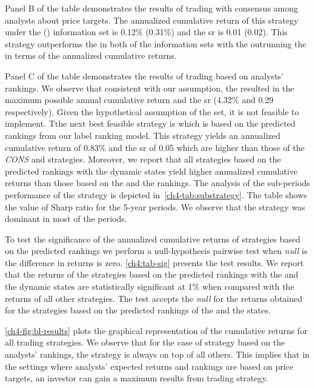 \documentclass[a4paper,twoside,12pt,openright,notitlepage]{report}\usepackage[]{graphicx}\usepackage[]{color}
\begin{document}
Panel B of the table demonstrates the results of trading with consensus among analysts about price targets. The annualized cumulative return of this strategy under the \recent{} () information set is 0.12\% (0.31\%) and the \gls{sr} is  0.01 (0.02). This strategy outperforms the \Market{} in both of the information sets with the  outrunning the \naive{} in terms of the annualized cumulative returns.

Panel C of the table demonstrates the results of trading based on analysts' rankings. We observe that consistent with our assumption, the \true{} resulted in the maximum possible annual cumulative return and the \gls{sr} (4.32\% and  0.29 respectively). Given the hypothetical assumption of the \true{} set, it is not feasible to implement. Tthe next best feasible strategy is
\diff{}
which is based on the predicted rankings from our label ranking model. This strategy yields an annualized cumulative return of 0.83\% and the \gls{sr} of 0.05 which are higher than those of the \textit{CONS} and \Market{} strategies. Moreover, we report that all strategies based on the predicted rankings with the dynamic states yield higher annualized cumulative returns than those  based on the  \naive{} and the  rankings. The analysis of the sub-periods performance of the \diff{} strategy is depicted in~\ref{ch4-tab:substrategy}. The table shows the value of Sharp ratio for the 5-year periods. We observe that the \diff{} strategy was dominant in most of the periods.

To test the significance of the annualized cumulative returns of strategies based on the predicted rankings we perform a null-hypothesis pairwise test when \emph{null} is the difference in returns is zero. \ref{ch4:tab-sig} presents the test results. We report that the returns of the strategies based on the predicted rankings with the \diff{} and the \random{} dynamic states are statistically significant at 1\% when compared with the returns of all other strategies. The test accepts the \emph{null} for the returns obtained for the strategies based on the predicted rankings of the \last{} and the \rollsd{} states.


\ref{ch4-fig:bl-results} plots the graphical representation of the cumulative returns for all  trading strategies. We observe that for the case of strategy based on the analysts' rankings, the \true{} strategy is always on top of all  others. This implies that in the settings where analysts' expected returns and rankings are based on price targets, an investor can gain a maximum results from trading strategy.
\end{document}
